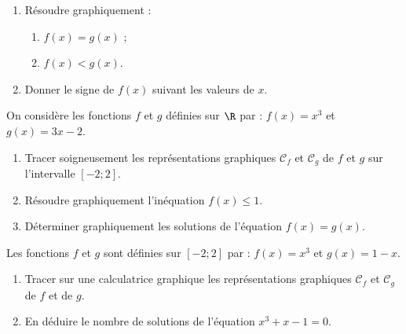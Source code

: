 \begin{multicols}{2}
\begin{exo}
\begin{enumerate}
	\item R\'esoudre graphiquement :
			\begin{enumerate}
				\item $f(x) = g(x)$ ;
				\item $f(x) < g(x)$.			\end{enumerate}
		\item Donner le signe de $f(x)$ suivant les valeurs de $x$.
\end{enumerate}
\end{exo}\end{multicols}


\begin{multicols}{2}

\begin{exo}
On consid\`ere les fonctions $f$ et $g$ d\'efinies sur $\R$ par : $f(x)=x^3$ et $g(x)=3x-2$.
 \begin{enumerate}
			\item Tracer soigneusement les repr\'esentations graphiques $\mathcal{C}_f$ et $\mathcal{C}_g$ de $f$ et $g$ sur l'intervalle $[-2;2]$.
			\item R\'esoudre graphiquement l'in\'equation $f(x)\leqslant 1$.
			\item D\'eterminer graphiquement les solutions de l'\'equation $f(x)=g(x)$.
 \end{enumerate}
\end{exo}

\sautcol

\begin{exo}
Les fonctions $f$ et $g$ sont d\'efinies sur $[-2;2]$ par : $f(x)=x^3$ et $g(x)=1-x$.
\begin{enumerate}
	\item Tracer sur une calculatrice graphique les repr\'esentations graphiques $\mathcal{C}_f$ et $\mathcal{C}_g$ de $f$ et de $g$.
	\item En d\'eduire le nombre de solutions de l'\'equation $x^3+x-1=0$.
	\end{enumerate}
\end{exo}

\end{multicols}

